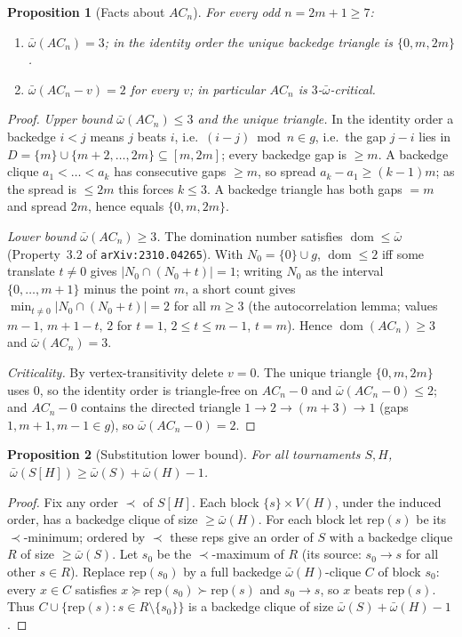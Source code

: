 \documentclass[11pt]{article}
\newcommand{\ob}{\bar\omega}
\DeclareMathOperator{\dom}{dom}
\theoremstyle{plain}
\newtheorem{proposition}{Proposition}
\theoremstyle{definition}
\begin{document}
\begin{proposition}[Facts about $AC_n$]\label{prop:acn}
For every odd $n=2m+1\ge 7$:
\begin{enumerate}[label=\textup{(\alph*)}]
\item $\ob(AC_n)=3$; in the identity order the unique backedge triangle is $\{0,m,2m\}$.
\item $\ob(AC_n-v)=2$ for every $v$; in particular $AC_n$ is $3$-$\ob$-critical.
\end{enumerate}
\end{proposition}
\begin{proof}
\emph{Upper bound $\ob(AC_n)\le 3$ and the unique triangle.} In the identity order a
backedge $i<j$ means $j$ beats $i$, i.e.\ $(i-j)\bmod n\in g$, i.e.\ the gap $j-i$ lies in
$D=\{m\}\cup\{m+2,\dots,2m\}\subseteq[m,2m]$; every backedge gap is $\ge m$. A backedge clique
$a_1<\dots<a_k$ has consecutive gaps $\ge m$, so spread $a_k-a_1\ge(k-1)m$; as the spread is
$\le 2m$ this forces $k\le 3$. A backedge triangle has both gaps $=m$ and spread $2m$, hence
equals $\{0,m,2m\}$.

\emph{Lower bound $\ob(AC_n)\ge 3$.} The domination number satisfies $\dom\le\ob$
(Property~3.2 of \texttt{arXiv:2310.04265}). With $N_0=\{0\}\cup g$, $\dom\le 2$ iff some
translate $t\ne 0$ gives $|N_0\cap(N_0+t)|=1$; writing $N_0$ as the interval $\{0,\dots,m+1\}$
minus the point $m$, a short count gives $\min_{t\ne 0}|N_0\cap(N_0+t)|=2$ for all $m\ge 3$
(the autocorrelation lemma; values $m-1,\,m+1-t,\,2$ for $t=1$, $2\le t\le m-1$, $t=m$). Hence
$\dom(AC_n)\ge 3$ and $\ob(AC_n)=3$.

\emph{Criticality.} By vertex-transitivity delete $v=0$. The unique triangle $\{0,m,2m\}$ uses
$0$, so the identity order is triangle-free on $AC_n-0$ and $\ob(AC_n-0)\le 2$; and $AC_n-0$
contains the directed triangle $1\to2\to(m+3)\to1$ (gaps $1,m+1,m-1\in g$), so $\ob(AC_n-0)=2$.
\end{proof}

\begin{proposition}[Substitution lower bound]\label{prop:lower}
For all tournaments $S,H$, $\ \ob(S[H])\ge\ob(S)+\ob(H)-1$.
\end{proposition}
\begin{proof}
Fix any order $\prec$ of $S[H]$. Each block $\{s\}\times V(H)$, under the induced order, has a
backedge clique of size $\ge\ob(H)$. For each block let $\mathrm{rep}(s)$ be its $\prec$-minimum;
ordered by $\prec$ these reps give an order of $S$ with a backedge clique $R$ of size
$\ge\ob(S)$. Let $s_0$ be the $\prec$-maximum of $R$ (its source: $s_0\to s$ for all other $s\in R$).
Replace $\mathrm{rep}(s_0)$ by a full backedge $\ob(H)$-clique $C$ of block $s_0$: every $x\in C$
satisfies $x\succeq\mathrm{rep}(s_0)\succ\mathrm{rep}(s)$ and $s_0\to s$, so $x$ beats
$\mathrm{rep}(s)$. Thus $C\cup\{\mathrm{rep}(s):s\in R\setminus\{s_0\}\}$ is a backedge clique of
size $\ob(S)+\ob(H)-1$.
\end{proof}
\end{document}
